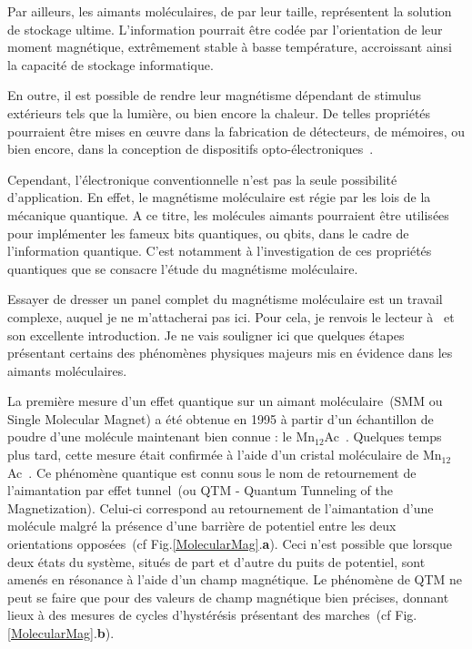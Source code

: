 Par ailleurs, les aimants moléculaires, de par leur taille, représentent la solution de stockage ultime. L'information pourrait être codée par l'orientation de leur moment magnétique, extrêmement stable à basse température, accroissant ainsi la capacité de stockage informatique.

En outre, il est possible de rendre leur magnétisme dépendant de stimulus extérieurs tels que la lumière, ou bien encore la chaleur. De telles propriétés pourraient \^etre mises en œuvre dans la fabrication de détecteurs, de mémoires, ou bien encore, dans la conception de dispositifs opto-électroniques~\cite{Sanvito2011}.

Cependant, l'électronique conventionnelle n'est pas la seule possibilité d'application. En effet, le magnétisme moléculaire est régie par les lois de la mécanique quantique. A ce titre, les molécules aimants pourraient \^etre utilisées pour implémenter les fameux bits quantiques, ou qbits, dans le cadre de l'information quantique. C'est notamment à l'investigation de ces propriétés quantiques que se consacre l'étude du magnétisme moléculaire.
 
Essayer de dresser un panel complet du magnétisme moléculaire est un travail complexe, auquel je ne m'attacherai pas ici. Pour cela, je renvois le lecteur à~\cite{Gatteschi2006} et son excellente introduction. Je ne vais souligner ici que quelques étapes présentant certains des phénomènes physiques majeurs mis en évidence dans les aimants moléculaires.

La première mesure d'un effet quantique sur un aimant moléculaire~(SMM ou Single Molecular Magnet) a été obtenue en 1995 à partir d'un échantillon de poudre d'une molécule maintenant bien connue : le Mn$_{12}$Ac~\cite{Friedman1996}. Quelques temps plus tard, cette mesure était confirmée à l'aide d'un cristal moléculaire de Mn$_{12}$Ac~\cite{Thomas1996}. Ce phénomène quantique est connu sous le nom de retournement de l'aimantation par effet tunnel~(ou QTM - Quantum Tunneling of the Magnetization).
Celui-ci correspond au retournement de l'aimantation d'une molécule malgré la présence d'une barrière de potentiel entre les deux orientations opposées~(cf Fig.\ref{MolecularMag}.\textbf{a}). Ceci n'est possible que lorsque deux états du système, situés de part et d'autre du puits de potentiel, sont amenés en résonance à l'aide d'un champ magnétique. Le phénomène de QTM ne peut se faire que pour des valeurs de champ magnétique bien précises, donnant lieux à des mesures de cycles d'hystérésis présentant des marches~(cf Fig.\ref{MolecularMag}.\textbf{b}).

